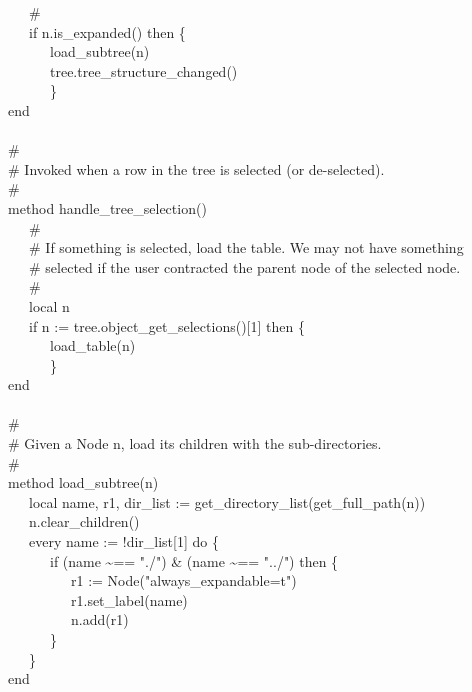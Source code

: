 {\>   \ \ \ \# \\
\>   \ \ \ if n.is\_expanded() then \{ \\
\>   \ \ \ \ \ \ load\_subtree(n) \\
\>   \ \ \ \ \ \ tree.tree\_structure\_changed() \\
\>   \ \ \ \ \ \ \} \\
\>   end \\
\ \\
\>   \# \\
\>   \# Invoked when a row in the tree is selected (or de-selected). \\
\>   \# \\
\>   method handle\_tree\_selection() \\
\>   \ \ \ \# \\
\>   \ \ \ \# If something is selected, load the table. We may not have something\\
\>   \ \ \ \# selected if the user contracted the parent node of the selected node. \\
\>   \ \ \ \# \\
\>   \ \ \ local n \\
\>   \ \ \ if n := tree.object\_get\_selections()[1] then \{ \\
\>   \ \ \ \ \ \ load\_table(n) \\
\>   \ \ \ \ \ \ \} \\
\>   end \\
\ \\
\>   \# \\
\>   \# Given a Node n, load its children with the sub-directories. \\
\>   \# \\
\>   method load\_subtree(n) \\
\>   \ \ \ local name, r1, dir\_list := get\_directory\_list(get\_full\_path(n)) \\
\>   \ \ \ n.clear\_children() \\
\>   \ \ \ every name := !dir\_list[1] do \{ \\
\>   \ \ \ \ \ \ if (name \~{}== "./") \&
(name \~{}== "../") then \{ \\
\>   \ \ \ \ \ \ \ \ \ r1 :=
Node("always\_expandable=t") \\
\>   \ \ \ \ \ \ \ \ \ r1.set\_label(name) \\
\>   \ \ \ \ \ \ \ \ \ n.add(r1) \\
\>   \ \ \ \ \ \ \} \\
\>   \ \ \ \} \\
\>   end \\
}
